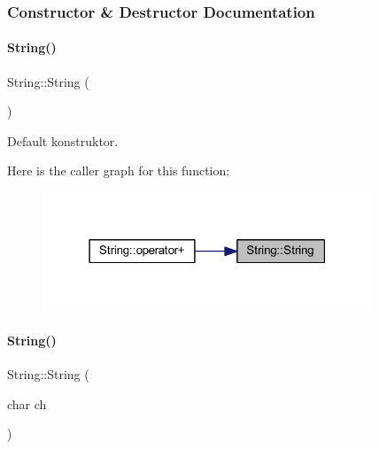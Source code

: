 \subsubsection{Constructor \& Destructor Documentation}
\mbox{\label{class_string_a8a7ef356e05eb9b1ea1ab518baee3095}} 
\paragraph{\texorpdfstring{String()}{String()}\hspace{0.1cm}{\footnotesize\ttfamily [1/4]}}
{\footnotesize\ttfamily String\+::\+String (\begin{DoxyParamCaption}{ }\end{DoxyParamCaption})\hspace{0.3cm}{\ttfamily [inline]}}



Default konstruktor. 

Here is the caller graph for this function\+:
\nopagebreak
\begin{figure}[H]
\begin{center}
\leavevmode
\includegraphics[width=279pt]{class_string_a8a7ef356e05eb9b1ea1ab518baee3095_icgraph}
\end{center}
\end{figure}
\mbox{\label{class_string_a62a77180f8df2547e8be1313654abcee}} 
\paragraph{\texorpdfstring{String()}{String()}\hspace{0.1cm}{\footnotesize\ttfamily [2/4]}}
{\footnotesize\ttfamily String\+::\+String (\begin{DoxyParamCaption}\item[{char}]{ch }\end{DoxyParamCaption})}



